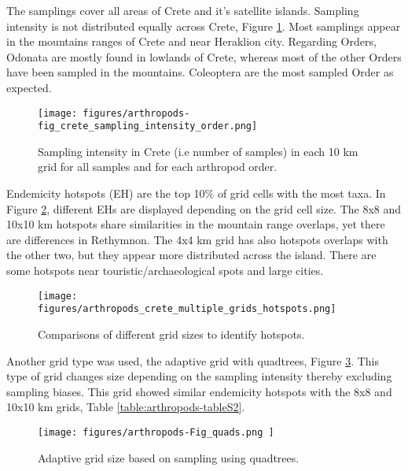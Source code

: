 The samplings cover all areas of Crete and it's satellite islands. 
Sampling intensity is not distributed equally across Crete, Figure \ref{fig:arthropods-sampling-intesity}.
Most samplings appear in the mountains ranges of Crete and near Heraklion city.
Regarding Orders, Odonata are mostly found in lowlands of Crete, whereas 
most of the other Orders have been sampled in the mountains. 
Coleoptera are the most sampled Order as expected. 


   \begin{figure}[htb!]
      \centering
      \texttt{[image: figures/arthropods-fig\_crete\_sampling\_intensity\_order.png]}
      \caption[Sampling intensity]{Sampling intensity in Crete (i.e number of samples) in each 10 km grid for all samples and for each arthropod order.}
      \label{fig:arthropods-sampling-intesity}
   \end{figure}

Endemicity hotspots (EH) are the top 10\% of grid cells with the most taxa. 
In Figure \ref{fig:arthropods-different-hotposts}, different EHs are 
displayed depending on the grid cell size. The 8x8 and 10x10 km 
hotspots share similarities in the mountain range overlaps, yet there 
are differences in Rethymnon. The 4x4 km grid has also hotspots overlaps 
with the other two, but they appear more distributed across the island. 
There are some hotspots near touristic/archaeological spots and large cities.


   \begin{figure}[htb!]
      \centering
      \texttt{[image: figures/arthropods\_crete\_multiple\_grids\_hotspots.png]}
      \caption[Comparisons of different grid sizes]{Comparisons of different grid sizes to identify hotspots.}
      \label{fig:arthropods-different-hotposts}
   \end{figure}
   
   Another grid type was used, the adaptive grid with quadtrees, Figure \ref{fig:arthropods-figS5}. This type of grid changes 
size depending on the sampling intensity thereby excluding sampling biases. This
grid showed similar endemicity hotspots with the 8x8 and 10x10 km grids, Table \ref{table:arthropods-tableS2}. 

   \begin{figure}[htb!]
      \centering
      \texttt{[image: figures/arthropods-Fig\_quads.png ]}
      \caption[Adaptive grid size based on sampling using quadtrees]{Adaptive grid size based on sampling using quadtrees.}
      \label{fig:arthropods-figS5}
   \end{figure}

